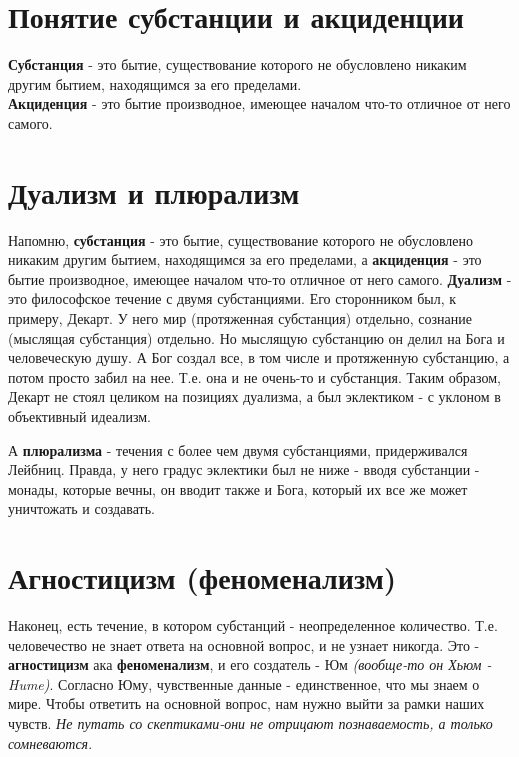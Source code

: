 \documentclass[12pt,a4paper]{article}
\begin{document}
\section{Понятие субстанции и акциденции}
\textbf{Субстанция} - это бытие, существование которого не обусловлено никаким другим бытием,
находящимся за его пределами.\\
\textbf{Акциденция} - это бытие производное, имеющее началом
что-то отличное от него самого.

\section{Дуализм и плюрализм}
Напомню, \textbf{субстанция} - это бытие, существование которого не обусловлено никаким другим бытием,
находящимся за его пределами,
а \textbf{акциденция} - это бытие производное, имеющее началом
что-то отличное от него самого. \textbf{Дуализм} - это философское течение с двумя субстанциями. Его сторонником был, к примеру, Декарт. У него мир (протяженная субстанция) отдельно, сознание (мыслящая субстанция) отдельно. Но мыслящую субстанцию он делил на Бога и человеческую душу. А Бог создал все, в том числе и протяженную субстанцию, а потом просто забил на нее. Т.е. она и не очень-то и субстанция. Таким образом, Декарт не стоял целиком на позициях дуализма, а был эклектиком - с уклоном в объективный идеализм. 

А \textbf{плюрализма} - течения с более чем двумя субстанциями, придерживался Лейбниц. Правда, у него градус эклектики был не ниже - вводя субстанции - монады, которые вечны, он вводит также и Бога, который их все же может уничтожать и создавать. 


\section{Агностицизм (феноменализм)}
Наконец, есть течение, в котором субстанций - неопределенное количество. Т.е. человечество не знает ответа на основной вопрос, и не узнает никогда. Это - \textbf{агностицизм} ака \textbf{феноменализм}, и его создатель - Юм \textit{(вообще-то он Хьюм - Hume)}. Согласно Юму, чувственные данные - единственное, что мы знаем о мире. Чтобы ответить на основной вопрос, нам нужно выйти за рамки наших чувств. \textit{Не путать со скептиками-они не отрицают познаваемость, а только сомневаются}.
\end{document}
